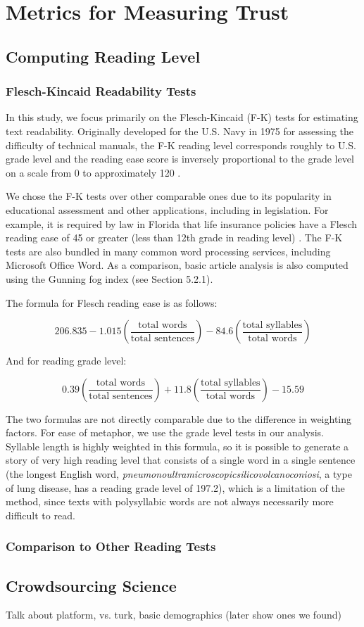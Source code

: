 \chapter{Metrics for Measuring Trust}

\section{Computing Reading Level}
\subsection{Flesch-Kincaid Readability Tests} 
In this study, we focus primarily on the Flesch-Kincaid (F-K) tests for estimating text readability. Originally developed for the U.S. Navy in 1975 for assessing the difficulty of technical manuals, the F-K reading level corresponds roughly to U.S. grade level and the reading ease score is inversely proportional to the grade level on a scale from 0 to approximately 120 \cite{kincaid1975derivation}.

We chose the F-K tests over other comparable ones due to its popularity in educational assessment and other applications, including in legislation. For example, it is required by law in Florida that life insurance policies have a Flesch reading ease of 45 or greater (less than 12th grade in reading level) \cite{Statu37online}. The F-K tests are also bundled in many common word processing services, including Microsoft Office Word. As a comparison, basic article analysis is also computed using the Gunning fog index (see Section 5.2.1).

The formula for Flesch reading ease is as follows:

$$206.835 - 1.015 \left( \frac{\mbox{total words}}{\mbox{total sentences}} \right) - 84.6 \left( \frac{\mbox{total syllables}}{\mbox{total words}} \right)$$

And for reading grade level:

$$0.39 \left ( \frac{\mbox{total words}}{\mbox{total sentences}} \right ) + 11.8 \left ( \frac{\mbox{total syllables}}{\mbox{total words}} \right ) - 15.59$$
 
The two formulas are not directly comparable due to the difference in weighting factors. For ease of metaphor, we use the grade level tests in our analysis. Syllable length is highly weighted in this formula, so it is possible to generate a story of very high reading level that consists of a single word in a single sentence (the longest English word, \emph{pneumonoultramicroscopicsilicovolcanoconiosi}, a type of lung disease, has a reading grade level of 197.2), which is a limitation of the method, since texts with polysyllabic words are not always necessarily more difficult to read.

\subsection{Comparison to Other Reading Tests}

\section{Crowdsourcing Science}
Talk about platform, vs. turk, basic demographics (later show ones we found) 
